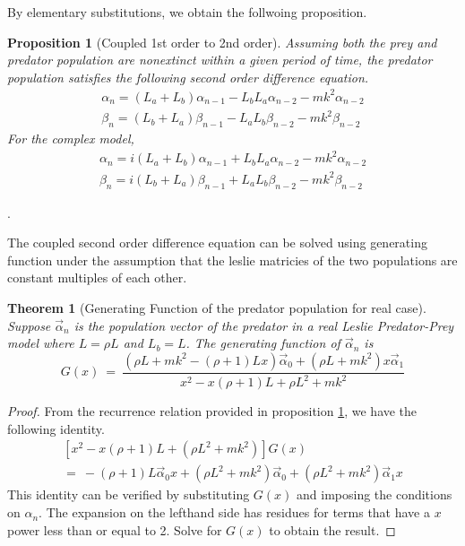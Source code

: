 \documentclass{article}
\newtheorem{theorem}{Theorem}[section]
\newtheorem{prop}{Proposition}[section]
\newtheorem{theorem}{Theorem}
\newtheorem{prop}{Proposition}
\numberwithin{equation}{section}
\begin{document}
By elementary substitutions, we obtain the follwoing proposition. 

\begin{prop}[Coupled 1st order to 2nd order]\label{thm:to2ndOrd}
Assuming both 
the prey and predator population are nonextinct within 
a given period of time, 
the predator population satisfies the following second order 
difference equation. 
\begin{eqnarray}
\alpha_n = (L_a + L_b) \alpha_{n - 1} - L_b L_a \alpha_{n -2} - m k^2 \alpha_{n - 2} \nonumber
\\
\beta_n = (L_b + L_a) \beta_{n - 1} - L_a L_b \beta_{n -2} - m k^2 \beta_{n - 2}
\end{eqnarray}
For the complex model, 
\begin{eqnarray}
\alpha_n = i(L_a + L_b) \alpha_{n - 1} + L_b L_a \alpha_{n -2} - m k^2 \alpha_{n - 2} \nonumber
\\
\beta_n = i(L_b + L_a) \beta_{n - 1} + L_a L_b \beta_{n -2} - m k^2 \beta_{n - 2}
\end{eqnarray}
\end{prop}. 


The coupled second order difference equation can be solved using 
generating function under the assumption that the leslie matricies 
of the two populations are constant multiples of each other. 

\begin{theorem} [Generating Function of the predator population for real case]
    Suppose $\vec \alpha_n$ is the population vector 
    of the predator in a real Leslie Predator-Prey model where 
    $L = \rho L$ and $L_b = L$. 
    The generating function of $\vec \alpha_n$ is
    \begin{equation}
        G(x) \ = \ 
\frac{ \left(\rho L + m k^2 - (\rho + 1) L x\right)\vec \alpha_0 + (\rho L + m k^2) x \vec  \alpha_1}{x^2 - x(\rho + 1) L + \rho L^2 + m k^2}
    \end{equation}
\end{theorem}

\begin{proof}
    From the recurrence relation provided in proposition \ref{thm:to2ndOrd}, 
    we have the following identity. 
    \begin{equation}
        \begin{split}
        \left[x^2 - x (\rho + 1) L + (\rho L^2 + mk^2)\right]G(x) \\ = \  
        -(\rho + 1) L \vec \alpha_0 x 
        +(\rho L^2 + mk^2) \vec \alpha_0 
        + (\rho L^2  + m k^2) \vec \alpha_1 x
        \end{split}
    \end{equation}
    This identity can be verified by substituting $G(x)$ and 
    imposing the conditions on $\alpha_n$. The expansion on the 
    lefthand side has residues for terms that have a $x$ power 
    less than or equal to 2. Solve for $G(x)$ to obtain the result. 
\end{proof}
\end{document}
